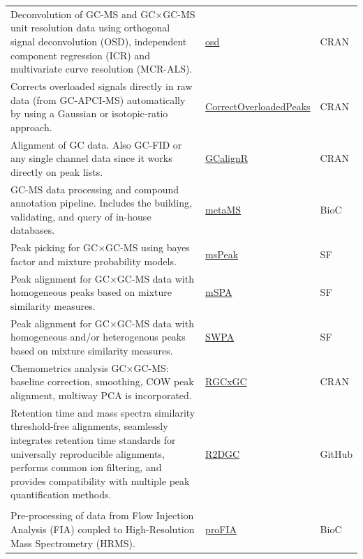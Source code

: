 \documentclass[]{article}
\begin{document}
\begin{longtable}[t]{>{\raggedright\arraybackslash}p{30em}>{\raggedright\arraybackslash}p{10em}>{\raggedright\arraybackslash}p{3em}}
Deconvolution of GC-MS and GC×GC-MS unit resolution data using orthogonal signal deconvolution (OSD), independent component regression (ICR) and multivariate curve resolution (MCR-ALS). & \href{http://cran.r-project.org/package=osd}{osd} & CRAN\\
\rowcolor{gray!6}  Corrects overloaded signals directly in raw data (from GC-APCI-MS) automatically by using a Gaussian or isotopic-ratio approach. & \href{https://cran.r-project.org/package=CorrectOverloadedPeaks}{CorrectOverloadedPeaks} & CRAN\\
Alignment of GC data. Also GC-FID or any single channel data since it works directly on peak lists. & \href{https://cran.r-project.org/package=GCalignR}{GCalignR} & CRAN\\
\rowcolor{gray!6}  GC-MS data processing and compound annotation pipeline. Includes the building, validating, and query of in-house databases. & \href{https://www.bioconductor.org/packages/release/bioc/html/metaMS.html}{metaMS} & BioC\\
Peak picking for GC×GC-MS using bayes factor and mixture probability models. & \href{http://mrr.sourceforge.net/download.html}{msPeak} & SF\\
\rowcolor{gray!6}  Peak alignment for GC×GC-MS data with homogeneous peaks based on mixture similarity measures. & \href{http://mrr.sourceforge.net/download.html}{mSPA} & SF\\
Peak alignment for GC×GC-MS data with homogeneous and/or heterogenous peaks based on mixture similarity measures. & \href{http://mrr.sourceforge.net/download.html}{SWPA} & SF\\
\rowcolor{gray!6}  Chemometrics analysis GC×GC-MS: baseline correction, smoothing, COW peak alignment, multiway PCA is incorporated. & \href{https://cran.r-project.org/package=RGCxGC}{RGCxGC} & CRAN\\
Retention time and mass spectra similarity threshold-free alignments, seamlessly integrates retention time standards for universally reproducible alignments, performs common ion filtering, and provides compatibility with multiple peak quantification methods. & \href{https://github.com/rramaker/R2DGC}{R2DGC} & GitHub\\
\rowcolor{gray!6}  \addlinespace[0.3em]
\multicolumn{3}{l}{\textbf{Flow injection / direct infusion analysis}}\\
Pre-processing of data from Flow Injection Analysis (FIA) coupled to High-Resolution Mass Spectrometry (HRMS). & \href{https://doi.org/doi:10.18129/B9.bioc.proFIA}{proFIA} & BioC\\

\end{longtable}
\end{document}
